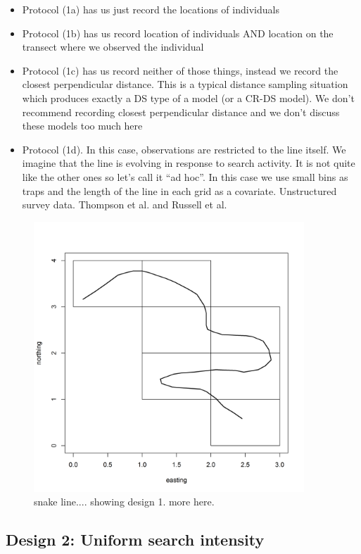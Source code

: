 \begin{itemize}
 \item[] Protocol (1a) has us just record the locations of individuals
 \item[] Protocol (1b) has us record location of individuals AND
   location on the transect where we observed the individual
 \item[] Protocol (1c) has us record neither of those things, instead
   we record the closest perpendicular distance. This is a typical
   distance sampling situation which produces exactly a DS type of a
   model (or a CR-DS model). We don't recommend recording closest
   perpendicular distance and we don't discuss these models too much
   here
 \item[] Protocol (1d). In this case, observations are restricted to
   the line itself. We imagine that the line is evolving in response
   to search activity. It is not quite like the other ones so let's
   call it ``ad hoc''. In this case we use small bins as traps and the
   length of the line in each grid as a covariate. Unstructured survey
   data. Thompson et al. and Russell et al.
 \end{itemize}


\begin{figure}
\centering
\includegraphics[width=4in,height=4in]{Ch15-searchencounter/figs/snakeline.png}
\caption{snake line.... showing design 1. more here.
}
\label{searchencounter.fig.snakeline}
\end{figure}



\subsection{Design 2: Uniform search intensity} 

